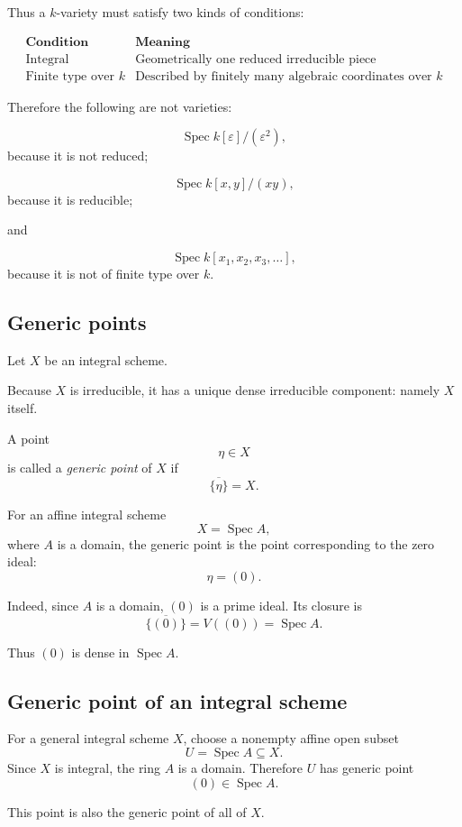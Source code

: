 \documentclass[12pt,a4paper]{article}
\DeclareMathOperator{\Spec}{Spec}
\providecommand{\Spec}{\operatorname{Spec}}
\theoremstyle{notespace}
\begin{document}
Thus a \(k\)-variety must satisfy two kinds of conditions:

\[
\begin{array}{c|c}
	\textbf{Condition} & \textbf{Meaning} \\
	\hline
	\text{Integral} & \text{Geometrically one reduced irreducible piece} \\
	\text{Finite type over }k & \text{Described by finitely many algebraic coordinates over }k
\end{array}
\]

Therefore the following are not varieties:

\[
\Spec k[\varepsilon]/(\varepsilon^2),
\]
because it is not reduced;

\[
\Spec k[x,y]/(xy),
\]
because it is reducible;

and

\[
\Spec k[x_1,x_2,x_3,\dots],
\]
because it is not of finite type over \(k\).

\subsection{Generic points}

Let \(X\) be an integral scheme.

Because \(X\) is irreducible, it has a unique dense irreducible component: namely \(X\) itself.

A point
\[
\eta\in X
\]
is called a \emph{generic point} of \(X\) if
\[
\overline{\{\eta\}}=X.
\]

For an affine integral scheme
\[
X=\Spec A,
\]
where \(A\) is a domain, the generic point is the point corresponding to the zero ideal:
\[
\eta=(0).
\]

Indeed, since \(A\) is a domain, \((0)\) is a prime ideal. Its closure is
\[
\overline{\{(0)\}}=V((0))=\Spec A.
\]

Thus \((0)\) is dense in \(\Spec A\).

\subsection{Generic point of an integral scheme}

For a general integral scheme \(X\), choose a nonempty affine open subset
\[
U=\Spec A\subseteq X.
\]
Since \(X\) is integral, the ring \(A\) is a domain. Therefore \(U\) has generic point
\[
(0)\in \Spec A.
\]

This point is also the generic point of all of \(X\).
\end{document}
